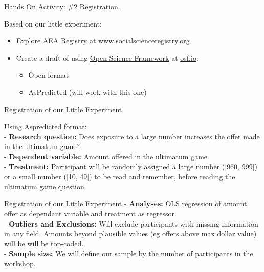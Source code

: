 \documentclass{beamer}
\begin{document}
\begin{frame}{Hands On Activity: \#2 Registration.}

Based on our little experiment:

\begin{itemize}
\item
  Explore \href{www.socialscienceregistry.org}{AEA Registry} at
  \url{www.socialscienceregistry.org}
\item
  Create a draft of using \href{osf.io}{Open Science Framework} at
  \url{osf.io}:

  \begin{itemize}
  \tightlist
  \item
    Open format
  \item
    AsPredicted (will work with this one)
  \end{itemize}
\end{itemize}

\end{frame}

\begin{frame}{Registration of our Little Experiment}

Using Aspredicted format:\\
\pause   - \textbf{Research question:} \pause  Does exposure to a large
number increases the offer made in the ultimatum game?\\
\pause   - \textbf{Dependent variable:} \pause  Amount offered in the
ultimatum game.\\
\pause   - \textbf{Treatment:} \pause  Participant will be randomly
assigned a large number ({[}960, 999{]}) or a small number ({[}10,
49{]}) to be read and remember, before reading the ultimatum game
question.

\end{frame}

\begin{frame}{Registration of our Little Experiment}
\pause     - \textbf{Analyses:} \pause  OLS regression of amount offer
as dependant variable and treatment as regressor.\\
\pause     - \textbf{Outliers and Exclusions:} \pause  Will exclude
participants with missing information in any field. Amounts beyond
plausible values (eg offers above max dollar value) will be will be
top-coded.\\
\pause   - \textbf{Sample size:} \pause  We will define our sample by
the number of participants in the workshop.

\end{frame}
\end{document}
